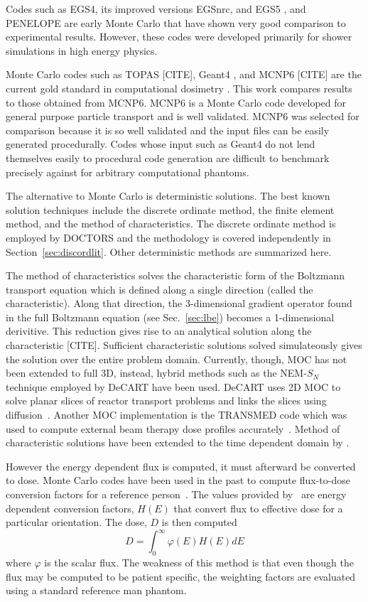 Codes such as EGS4, its improved versions EGSnrc, and EGS5 \citep{ref:nelsonw}, and PENELOPE \citep{ref:salvatf} are early Monte Carlo that have shown very good comparison to experimental results. However, these codes were developed primarily for shower simulations in high energy physics.

Monte Carlo codes such as TOPAS [CITE], Geant4 \citep{ref:agostinellis}, and MCNP6 [CITE] are the current gold standard in computational dosimetry \citep{ref:jiax}. This work compares results to those obtained from MCNP6. MCNP6 is a Monte Carlo code developed for general purpose particle transport and is well validated. MCNP6 was selected for comparison because it is so well validated and the input files can be easily generated procedurally. Codes whose input such as Geant4 do not lend themselves easily to procedural code generation are difficult to benchmark precisely against for arbitrary computational phantoms.

The alternative to Monte Carlo is deterministic solutions. The best known solution techniques include the discrete ordinate method, the finite element method, and the method of characteristics. The discrete ordinate method is employed by DOCTORS and the methodology is covered independently in Section~\ref{sec:discordlit}. Other deterministic methods are summarized here.

The method of characteristics solves the characteristic form of the Boltzmann transport equation which is defined along a single direction (called the characteristic). Along that direction, the 3-dimensional gradient operator found in the full Boltzmann equation (see Sec.~\ref{sec:lbe}) becomes a 1-dimensional derivitive. This reduction gives rise to an analytical solution along the characteristic [CITE]. Sufficient characteristic solutions solved simulateously gives the solution over the entire problem domain. Currently, though, MOC has not been extended to full 3D, instead, hybrid methods such as the NEM-$S_N$ technique employed by DeCART have been used. DeCART uses 2D MOC to solve planar slices of reactor transport problems and links the slices using diffusion~\citep{ref:hursinm}. Another MOC implementation is the TRANSMED code which was used to compute external beam therapy dose profiles accurately~\citep{ref:williamsm}. Method of characteristic solutions have been extended to the time dependent domain by \citet{ref:hoffmana}.

However the energy dependent flux is computed, it must afterward be converted to dose. Monte Carlo codes have been used in the past to compute flux-to-dose conversion factors for a reference person~\citep{ref:icrp116}. The values provided by~\citet{ref:icrp116} are energy dependent conversion factors, $H(E)$ that convert flux to effective dose for a particular orientation. The dose, $D$ is then computed
\begin{equation}
D = \int_0^\infty \varphi(E) H(E) dE
\end{equation}
where $\varphi$ is the scalar flux. The weakness of this method is that even though the flux may be computed to be patient specific, the weighting factors are evaluated using a standard reference man phantom.

